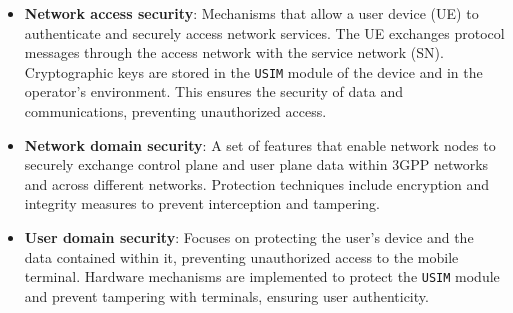 \documentclass[english]{article}
\begin{document}
\begin{itemize}
	\item \textbf{Network access security}:
	      Mechanisms that allow a user device (UE) to authenticate and securely
	      access network services. The UE exchanges protocol messages through
	      the access network with the service network (SN). Cryptographic keys
	      are stored in the \texttt{USIM} module of the device and in the operator's
	      environment. This ensures the security of data and communications,
	      preventing unauthorized access.
	\item \textbf{Network domain security}:
	      A set of features that enable network nodes to securely exchange
	      control plane and user plane data within 3GPP networks and across
	      different networks. Protection techniques include encryption and
	      integrity measures to prevent interception and tampering.
	\item \textbf{User domain security}:
	      Focuses on protecting the user's device and the data contained
	      within it, preventing unauthorized access to the mobile terminal.
	      Hardware mechanisms are implemented to protect the \texttt{USIM} module
	      and prevent tampering with terminals, ensuring user authenticity.

\end{itemize}
\end{document}
